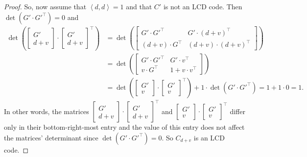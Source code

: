 \documentclass[11pt]{article}
\theoremstyle{definition}
\newcommand{\Ang}[1]{\left\langle#1\right\rangle}
\begin{document}
\begin{proof}
	So, now assume that $\Ang{d, d} = 1$ and that $C'$ is not an LCD code.
	Then $\det(G' \cdot G'^\top) = 0$ and
	\begin{align*}
		\det \left( \begin{bmatrix}
			G' \\
			d + v
		\end{bmatrix} \cdot {\begin{bmatrix}
			G' \\
			d + v
		\end{bmatrix}}^\top \right)
		&= \det \left( \begin{bmatrix}
			G' \cdot G'^\top & G' \cdot {(d + v)}^\top \\
			(d + v) \cdot G^\top & (d + v) \cdot {(d + v)}^\top
		\end{bmatrix} \right) \\
		&= \det \left( \begin{bmatrix}
			G' \cdot G'^\top & G' \cdot v^\top \\
			v \cdot G^\top & 1 + v \cdot v^\top
		\end{bmatrix} \right) \\
		&= \det \left( \begin{bmatrix}
			G' \\
			v
		\end{bmatrix} \cdot {\begin{bmatrix}
			G' \\
			v
		\end{bmatrix}}^\top \right) + 1 \cdot \det \left( G' \cdot G'^\top \right)
		= 1 + 1 \cdot 0
		= 1.
	\end{align*}
	In other words, the matrices $\begin{bmatrix} G' \\ d + v \end{bmatrix} \cdot {\begin{bmatrix} G' \\ d + v \end{bmatrix}}^\top$ and $\begin{bmatrix} G' \\ v \end{bmatrix} \cdot {\begin{bmatrix} G' \\ v \end{bmatrix}}^\top$ differ only in their bottom-right-most entry and the value of this entry does not affect the matrices' determinant since $\det(G' \cdot G'^\top) = 0$.
	So $C_{d + v}$ is an LCD code.
\end{proof}
\end{document}
